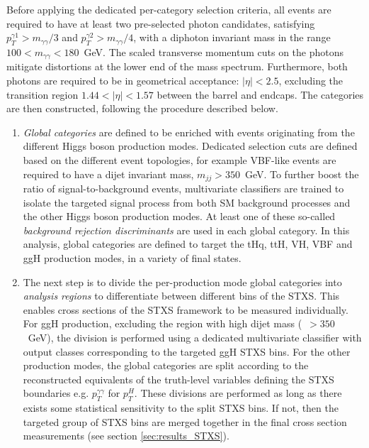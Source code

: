 Before applying the dedicated per-category selection criteria, all events are required to have at least two pre-selected photon candidates, satisfying $p_T^{\gamma 1}>m_{\gamma\gamma}/3$ and $p_T^{\gamma 2}>m_{\gamma\gamma}/4$, with a diphoton invariant mass in the range $100<m_{\gamma\gamma}<180$~GeV. The scaled transverse momentum cuts on the photons mitigate distortions at the lower end of the mass spectrum. Furthermore, both photons are required to be in geometrical acceptance: $|\eta|<2.5$, excluding the transition region $1.44<|\eta|<1.57$ between the barrel and endcaps. The categories are then constructed, following the procedure described below.

\begin{enumerate}
    \item \textit{Global categories} are defined to be enriched with events originating from the different Higgs boson production modes. Dedicated selection cuts are defined based on the different event topologies, for example VBF-like events are required to have a dijet invariant mass, $m_{jj}>350$~GeV. To further boost the ratio of signal-to-background events, multivariate classifiers are trained to isolate the targeted signal process from both SM background processes and the other Higgs boson production modes. At least one of these so-called \textit{background rejection discriminants} are used in each global category. In this analysis, global categories are defined to target the tHq, ttH, VH, VBF and ggH production modes, in a variety of final states.
    
    \item The next step is to divide the per-production mode global categories into \textit{analysis regions} to differentiate between different bins of the STXS. This enables cross sections of the STXS framework to be measured individually. For ggH production, excluding the region with high dijet mass (\mjj~$>350$~GeV), the division is performed using a dedicated multivariate classifier with output classes corresponding to the targeted ggH STXS bins. For the other production modes, the global categories are split according to the reconstructed equivalents of the truth-level variables defining the STXS boundaries e.g. $p_T^{\gamma\gamma}$ for $p_T^H$. These divisions are performed as long as there exists some statistical sensitivity to the split STXS bins. If not, then the targeted group of STXS bins are merged together in the final cross section measurements (see section \ref{sec:results_STXS}). 
    

\end{enumerate}
